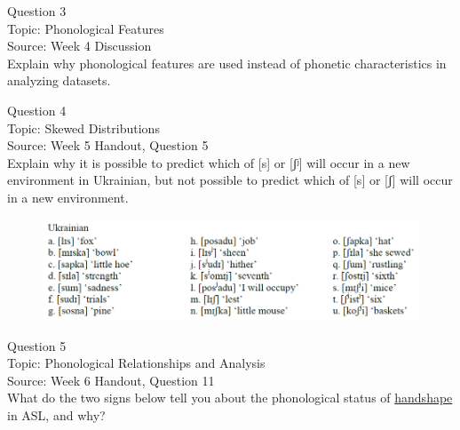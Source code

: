 \documentclass[12pt]{article}
\begin{document}
\newpage

{\large Question 3}\\

Topic: Phonological Features\\
Source: Week 4 Discussion\\

Explain why phonological features are used instead of phonetic characteristics in analyzing datasets.\\


\newpage

{\large Question 4}\\

Topic: Skewed Distributions\\
Source: Week 5 Handout, Question 5\\

Explain why it is possible to predict which of [s] or [ʃʲ] will occur in a new environment in Ukrainian, but not possible to predict which of [s] or [ʃ] will occur in a new environment.\\

\begin{figure}[H]
\includegraphics{../images/ukrainian.png}
\end{figure}

\newpage

{\large Question 5}\\

Topic: Phonological Relationships and Analysis\\
Source: Week 6 Handout, Question 11\\

What do the two signs below tell you about the phonological status of \underline{handshape} in ASL, and why?\\
\end{document}
